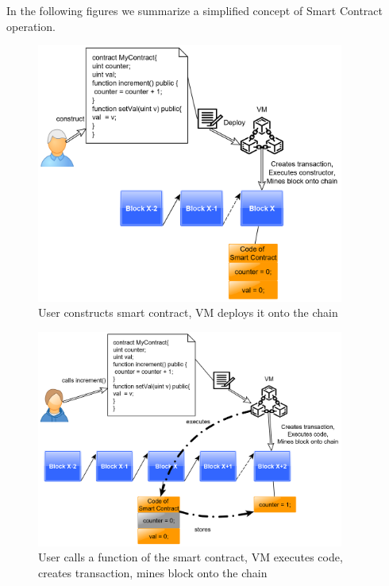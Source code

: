 \documentclass[a4paper]{article}
\begin{document}


In the following figures we summarize a simplified concept of Smart Contract operation.

\begin{figure}[H]
    \centering
    \includegraphics[width=0.9\textwidth]{figures/deploy_0.png}
    \caption{User constructs smart contract, VM deploys it onto the chain}
    \label{fig:deploy_0}
\end{figure}
\begin{figure}[H]
    \centering
    \includegraphics[width=0.9\textwidth]{figures/deploy_1.png}
    \caption{User calls a function of the smart contract, VM executes code, creates transaction, mines block onto the chain}
    \label{fig:deploy_1}
\end{figure}
\end{document}
